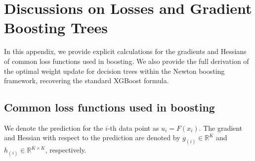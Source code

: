 \documentclass{article}
\theoremstyle{plain}
\theoremstyle{definition}
\theoremstyle{remark}
\begin{document}




\newpage
\appendix
\onecolumn






\section{Discussions on Losses and Gradient Boosting Trees}

In this appendix, we provide explicit calculations for the gradients and Hessians of common loss functions used in boosting. We also provide the full derivation of the optimal weight update for decision trees within the Newton boosting framework, recovering the standard XGBoost formula.

\subsection{Common loss functions used in boosting}


We denote the prediction for the $i$-th data point as $u_i = F(x_i)$. The gradient and Hessian with respect to the prediction are denoted by $g_{(i)} \in \mathbb{R}^K$ and $h_{(i)} \in \mathbb{R}^{K \times K}$, respectively.
\end{document}
